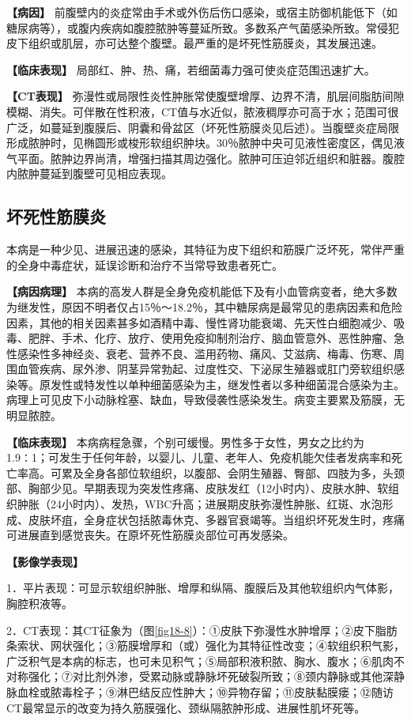 \textbf{【病因】}
前腹壁内的炎症常由手术或外伤后伤口感染，或宿主防御机能低下（如糖尿病等），或腹内疾病如腹腔脓肿等蔓延所致。多数系产气菌感染所致。常侵犯皮下组织或肌层，亦可达整个腹壁。最严重的是坏死性筋膜炎，其发展迅速。

\textbf{【临床表现】}
局部红、肿、热、痛，若细菌毒力强可使炎症范围迅速扩大。

\textbf{【CT表现】}
弥漫性或局限性炎性肿胀常使腹壁增厚、边界不清，肌层间脂肪间隙模糊、消失。可伴散在性积液，CT值与水近似，脓液稠厚亦可高于水；范围可很广泛，如蔓延到腹膜后、阴囊和骨盆区（坏死性筋膜炎见后述）。当腹壁炎症局限形成脓肿时，见椭圆形或梭形软组织肿块。30％脓肿中央可见液性密度区，偶见液气平面。脓肿边界尚清，增强扫描其周边强化。脓肿可压迫邻近组织和脏器。腹腔内脓肿蔓延到腹壁可见相应表现。

\subsection{坏死性筋膜炎}

本病是一种少见、进展迅速的感染，其特征为皮下组织和筋膜广泛坏死，常伴严重的全身中毒症状，延误诊断和治疗不当常导致患者死亡。

\textbf{【病因病理】}
本病的高发人群是全身免疫机能低下及有小血管病变者，绝大多数为继发性，原因不明者仅占15％～18.2％，其中糖尿病是最常见的患病因素和危险因素，其他的相关因素甚多如酒精中毒、慢性肾功能衰竭、先天性白细胞减少、吸毒、肥胖、手术、化疗、放疗、使用免疫抑制剂治疗、脑血管意外、恶性肿瘤、急性感染性多神经炎、衰老、营养不良、滥用药物、痛风、艾滋病、梅毒、伤寒、周围血管疾病、尿外渗、阴茎异常勃起、过度性交、下泌尿生殖器或肛门旁软组织感染等。原发性或特发性以单种细菌感染为主，继发性者以多种细菌混合感染为主。病理上可见皮下小动脉栓塞、缺血，导致侵袭性感染发生。病变主要累及筋膜，无明显脓腔。

\textbf{【临床表现】}
本病病程急骤，个别可缓慢。男性多于女性，男女之比约为1.9∶1；可发生于任何年龄，以婴儿、儿童、老年人、免疫机能欠佳者发病率和死亡率高。可累及全身各部位软组织，以腹部、会阴生殖器、臀部、四肢为多，头颈部、胸部少见。早期表现为突发性疼痛、皮肤发红（12小时内）、皮肤水肿、软组织肿胀（24小时内）、发热，WBC升高；进展期皮肤弥漫性肿胀、红斑、水泡形成、皮肤坏疽，全身症状包括脓毒休克、多器官衰竭等。当组织坏死发生时，疼痛可进展直到感觉丧失。在原坏死性筋膜炎部位可再发感染。

\textbf{【影像学表现】}

1．平片表现：可显示软组织肿胀、增厚和纵隔、腹膜后及其他软组织内气体影，胸腔积液等。

2．CT表现：其CT征象为（图\ref{fig18-8}）：①皮肤下弥漫性水肿增厚；②皮下脂肪条索状、网状强化；③筋膜增厚和（或）强化为其特征性改变；④软组织积气影，广泛积气是本病的标志，也可未见积气；⑤局部积液积脓、胸水、腹水；⑥肌肉不对称强化；⑦对比剂外渗，受累动脉或静脉坏死破裂所致；⑧颈内静脉或其他深静脉血栓或脓毒栓子；⑨淋巴结反应性肿大；⑩异物存留；⑪皮肤黏膜瘘；⑫随访CT最常显示的改变为持久筋膜强化、颈纵隔脓肿形成、进展性肌坏死等。


